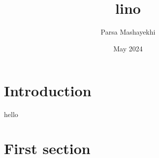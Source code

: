 \documentclass{article}
\title{lino}
\author{Parsa Mashayekhi}
\date{May 2024}
\begin{document}
\maketitle

\section{Introduction}
hello 
\section{First section}
\end{document}

